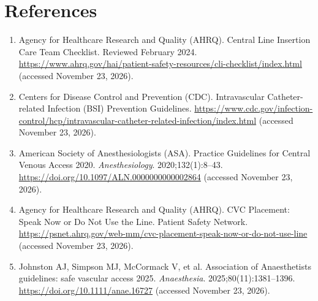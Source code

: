 \section*{References}
\begin{enumerate}
  \item Agency for Healthcare Research and Quality (AHRQ). Central Line Insertion Care Team Checklist. Reviewed February 2024. \url{https://www.ahrq.gov/hai/patient-safety-resources/cli-checklist/index.html} (accessed November 23, 2026).
  \item Centers for Disease Control and Prevention (CDC). Intravascular Catheter-related Infection (BSI) Prevention Guidelines. \url{https://www.cdc.gov/infection-control/hcp/intravascular-catheter-related-infection/index.html} (accessed November 23, 2026).
  \item American Society of Anesthesiologists (ASA). Practice Guidelines for Central Venous Access 2020. \textit{Anesthesiology}. 2020;132(1):8--43. \url{https://doi.org/10.1097/ALN.0000000000002864} (accessed November 23, 2026).
  \item Agency for Healthcare Research and Quality (AHRQ). CVC Placement: Speak Now or Do Not Use the Line. Patient Safety Network. \url{https://psnet.ahrq.gov/web-mm/cvc-placement-speak-now-or-do-not-use-line} (accessed November 23, 2026).
  \item Johnston AJ, Simpson MJ, McCormack V, et al. Association of Anaesthetists guidelines: safe vascular access 2025. \textit{Anaesthesia}. 2025;80(11):1381--1396. \url{https://doi.org/10.1111/anae.16727} (accessed November 23, 2026).
\end{enumerate}

\clearpage
